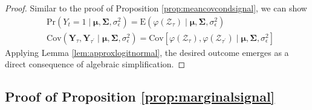 \begin{proof}
Similar to the proof of Proposition \ref{prop:meancovcondsignal}, we can show
\begin{equation*}
    \begin{split}
        &\text{Pr}(Y_t=1\mid \boldsymbol{\mu},\boldsymbol{\Sigma},\sigma_{\epsilon}^2)=\text{E}(\varphi(\mathcal{Z}_{\tau})\mid \boldsymbol{\mu},\boldsymbol{\Sigma},\sigma_{\epsilon}^2)\\
        &\text{Cov}(\mathbf{Y}_{\tau},\mathbf{Y}_{\tau^{\prime}}\mid\boldsymbol{\mu},\boldsymbol{\Sigma},\sigma_{\epsilon}^2)=\text{Cov}[\varphi(\mathcal{Z}_{\tau}),\varphi(\mathcal{Z}_{\tau^{\prime}})\mid \boldsymbol{\mu},\boldsymbol{\Sigma},\sigma_{\epsilon}^2]
    \end{split}
\end{equation*}
Applying Lemma \ref{lem:approxlogitnormal}, the desired outcome emerges as a direct consequence of algebraic simplification. 
\end{proof}



\subsection*{Proof of Proposition \ref{prop:marginalsignal}}
\label{subsec:proofmarginalsignal}

